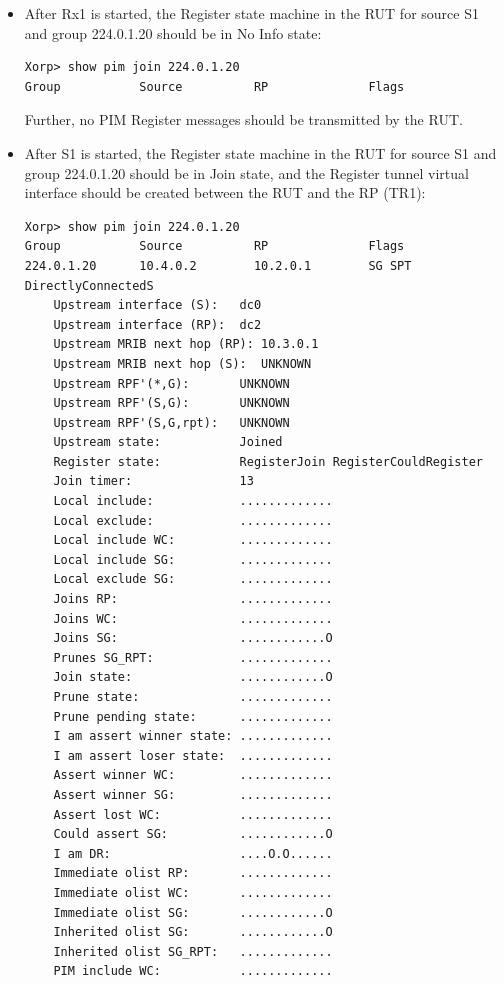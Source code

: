 \documentclass[11pt]{report}
\begin{document}
\begin{itemize}

  \item After Rx1 is started, the Register state machine in the RUT for source
  S1 and group 224.0.1.20 should be in No Info state:

\begin{verbatim}
Xorp> show pim join 224.0.1.20
Group           Source          RP              Flags
\end{verbatim}

  Further, no PIM Register messages should be transmitted by the RUT.

  \item After S1 is started, the Register state machine in the RUT for source
  S1 and group 224.0.1.20 should be in Join state, and the Register tunnel
  virtual interface should be created between the RUT and the RP (TR1):

\begin{verbatim}
Xorp> show pim join 224.0.1.20
Group           Source          RP              Flags
224.0.1.20      10.4.0.2        10.2.0.1        SG SPT DirectlyConnectedS 
    Upstream interface (S):   dc0
    Upstream interface (RP):  dc2
    Upstream MRIB next hop (RP): 10.3.0.1
    Upstream MRIB next hop (S):  UNKNOWN
    Upstream RPF'(*,G):       UNKNOWN
    Upstream RPF'(S,G):       UNKNOWN
    Upstream RPF'(S,G,rpt):   UNKNOWN
    Upstream state:           Joined 
    Register state:           RegisterJoin RegisterCouldRegister 
    Join timer:               13
    Local include:            .............
    Local exclude:            .............
    Local include WC:         .............
    Local include SG:         .............
    Local exclude SG:         .............
    Joins RP:                 .............
    Joins WC:                 .............
    Joins SG:                 ............O
    Prunes SG_RPT:            .............
    Join state:               ............O
    Prune state:              .............
    Prune pending state:      .............
    I am assert winner state: .............
    I am assert loser state:  .............
    Assert winner WC:         .............
    Assert winner SG:         .............
    Assert lost WC:           .............
    Could assert SG:          ............O
    I am DR:                  ....O.O......
    Immediate olist RP:       .............
    Immediate olist WC:       .............
    Immediate olist SG:       ............O
    Inherited olist SG:       ............O
    Inherited olist SG_RPT:   .............
    PIM include WC:           .............
\end{verbatim}


\end{itemize}
\end{document}
